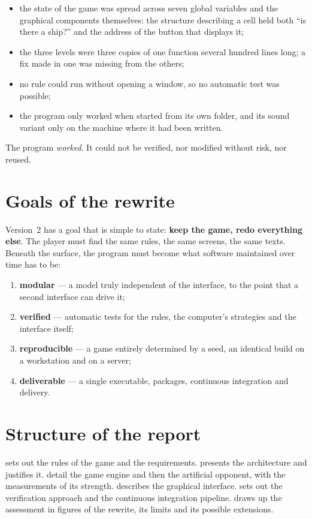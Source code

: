 \begin{itemize}
    \item the state of the game was spread across seven global variables and the graphical
          components themselves: the structure describing a cell held both
          \enquote{is there a ship?} and the address of the button that displays it;
    \item the three levels were three copies of one function several hundred lines long; a
          fix made in one was missing from the others;
    \item no rule could run without opening a window, so no automatic test was possible;
    \item the program only worked when started from its own folder, and its sound variant
          only on the machine where it had been written.
\end{itemize}

The program \emph{worked}. It could not be verified, nor modified without risk, nor reused.

\section{Goals of the rewrite}

Version~2 has a goal that is simple to state: \textbf{keep the game, redo everything else}.
The player must find the same rules, the same screens, the same texts. Beneath the surface,
the program must become what software maintained over time has to be:

\begin{enumerate}
    \item \textbf{modular} --- a model truly independent of the interface, to the point that
          a second interface can drive it;
    \item \textbf{verified} --- automatic tests for the rules, the computer's strategies and
          the interface itself;
    \item \textbf{reproducible} --- a game entirely determined by a seed, an identical build
          on a workstation and on a server;
    \item \textbf{deliverable} --- a single executable, packages, continuous integration and
          delivery.
\end{enumerate}

\section{Structure of the report}

 sets out the rules of the game and the requirements.
 presents the architecture and justifies it.
 detail the game engine and then the artificial opponent,
with the measurements of its strength.  describes the graphical
interface.  sets out the verification approach and the continuous
integration pipeline.  draws up the assessment in figures of the rewrite,
its limits and its possible extensions.
